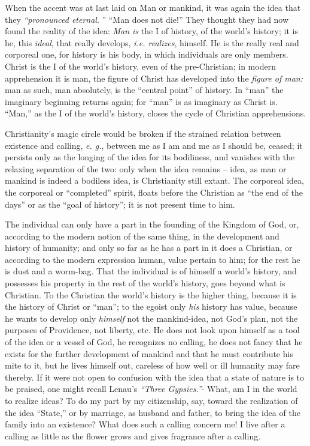 \documentclass[12pt,a4paper]{book}
\begin{document}
When the accent was at last laid on Man or mankind, it was again the idea that 
they \textit{``pronounced eternal}. '' ``Man does not die!'' They thought 
they had now found the reality of the idea: \textit{Man is} the I of history, 
of the world's history; it is he, this \textit{ideal}, that really develops, 
\textit{i.e. realizes}, himself. He is the really real and corporeal one, for 
history is his body, in which individuals are only members. Christ is the I of 
the world's history, even of the pre-Christian; in modern apprehension it is 
man, the figure of Christ has developed into the \textit{figure of man:} man 
as such, man absolutely, is the ``central point'' of history. In ``man'' 
the imaginary beginning returns again; for ``man'' is as imaginary as Christ 
is. ``Man,'' as the I of the world's history, closes the cycle of Christian 
apprehensions.

Christianity's magic circle would be broken if the strained relation between 
existence and calling, \textit{e. g.}, between me as I am and me as I should 
be, ceased; it persists only as the longing of the idea for its bodiliness, 
and vanishes with the relaxing separation of the two: only when the idea 
remains -- idea, as man or mankind is indeed a bodiless idea, is Christianity 
still extant. The corporeal idea, the corporeal or ``completed'' spirit, 
floats before the Christian as ``the end of the days'' or as the ``goal of 
history''; it is not present time to him.

The individual can only have a part in the founding of the Kingdom of God, or, 
according to the modern notion of the same thing, in the development and 
history of humanity; and only so far as he has a part in it does a Christian, 
or according to the modern expression human, value pertain to him; for the 
rest he is dust and a worm-bag. That the individual is of himself a world's 
history, and possesses his property in the rest of the world's history, goes 
beyond what is Christian. To the Christian the world's history is the higher 
thing, because it is the history of Christ or ``man''; to the egoist only 
\textit{his} history has value, because he wants to develop only 
\textit{himself} not the mankind-idea, not God's plan, not the purposes of 
Providence, not liberty, etc. He does not look upon himself as a tool of the 
idea or a vessel of God, he recognizes no calling, he does not fancy that he 
exists for the further development of mankind and that he must contribute his 
mite to it, but he lives himself out, careless of how well or ill humanity may 
fare thereby. If it were not open to confusion with the idea that a state of 
nature is to be praised, one might recall Lenau's \textit{``Three 
Gypsies.''}- What, am I in the world to realize ideas? To do my part by my 
citizenship, say, toward the realization of the idea ``State,'' or by 
marriage, as husband and father, to bring the idea of the family into an 
existence? What does such a calling concern me! I live after a calling as 
little as the flower grows and gives fragrance after a calling.
\end{document}
